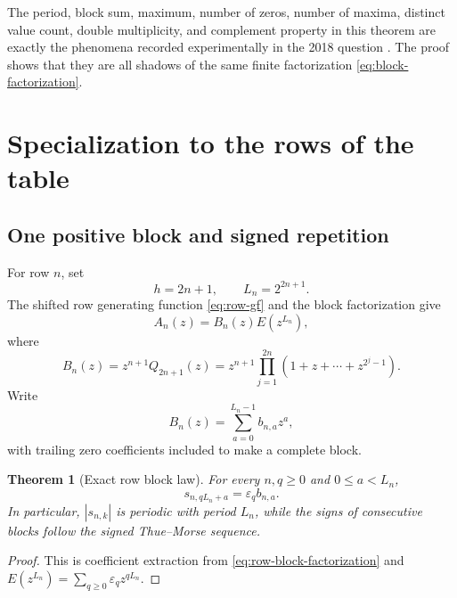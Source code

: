 \documentclass[11pt,oneside]{article}
\numberwithin{equation}{section}
\newtheorem{theorem}{Theorem}[section]
\theoremstyle{definition}
\theoremstyle{remark}
\newcommand{\eps}{\varepsilon}
\begin{document}
The period, block sum, maximum, number of zeros, number of maxima, distinct
value count, double multiplicity, and complement property in this theorem are
exactly the phenomena recorded experimentally in the 2018 question
\cite{ReshetnikovMSE}.  The proof shows that they are all shadows of the same
finite factorization \eqref{eq:block-factorization}.

\section{Specialization to the rows of the table}

\subsection{One positive block and signed repetition}

For row \(n\), set
\begin{equation}
 h=2n+1,
 \qquad
 L_n=2^{2n+1}.
 \label{eq:row-h-L}
\end{equation}
The shifted row generating function \eqref{eq:row-gf} and the block
factorization give
\begin{equation}
 A_n(z)=B_n(z)E(z^{L_n}),
 \label{eq:row-block-factorization}
\end{equation}
where
\begin{equation}
 \boxed{
 B_n(z)=z^{n+1}Q_{2n+1}(z)
 =z^{n+1}\prod_{j=1}^{2n}
 (1+z+\cdots+z^{2^j-1}).}
 \label{eq:Bn-definition}
\end{equation}
Write
\begin{equation}
 B_n(z)=\sum_{a=0}^{L_n-1}b_{n,a}z^a,
 \label{eq:bna-definition}
\end{equation}
with trailing zero coefficients included to make a complete block.

\begin{theorem}[Exact row block law]
For every \(n,q\ge0\) and \(0\le a<L_n\),
\begin{equation}
 \boxed{s_{n,qL_n+a}=\eps_q b_{n,a}.}
 \label{eq:row-signed-block}
\end{equation}
In particular, \(|s_{n,k}|\) is periodic with period \(L_n\), while the signs
of consecutive blocks follow the signed Thue--Morse sequence.
\end{theorem}

\begin{proof}
This is coefficient extraction from
\eqref{eq:row-block-factorization} and
\(E(z^{L_n})=\sum_{q\ge0}\eps_qz^{qL_n}\).
\end{proof}
\end{document}
